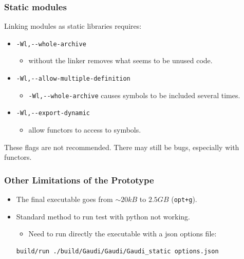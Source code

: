 \documentclass{beamer}
\begin{document}
\begin{frame}[fragile]
    \frametitle{Static modules}

    Linking modules as static libraries requires:
    \begin{itemize}
        \item \verb'-Wl,--whole-archive'
              \begin{itemize}
                  \item without the linker removes what seems to be unused code.
              \end{itemize}
        \item \verb'-Wl,--allow-multiple-definition'
              \begin{itemize}
                  \item \verb'-Wl,--whole-archive' causes symbols to be included several times.
              \end{itemize}
        \item \verb'-Wl,--export-dynamic'
              \begin{itemize}
                  \item allow functors to access to symbols.
              \end{itemize}
    \end{itemize}

    These flags are not recommended.
    There may still be bugs, especially with functors.
\end{frame}

\begin{frame}[fragile]
    \frametitle{Other Limitations of the Prototype}

    \begin{itemize}
        \item The final executable goes from $ \sim 20 kB $ to $ 2.5 GB $ (\verb'opt+g').
        \item Standard method to run test with python not working.
              \begin{itemize}
                  \item Need to run directly the executable with a json options file:
              \end{itemize}
              \begin{lstlisting}[language=bash,basicstyle=\scriptsize,breaklines]
build/run ./build/Gaudi/Gaudi/Gaudi_static options.json
            \end{lstlisting}
    \end{itemize}
\end{frame}
\end{document}
